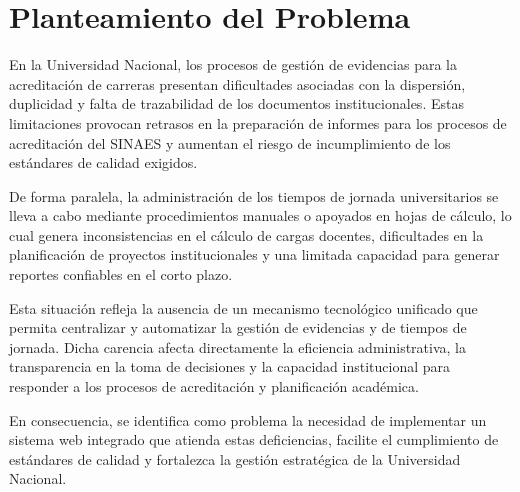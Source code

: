 \chapter{Planteamiento del Problema}

En la Universidad Nacional, los procesos de gestión de evidencias para la acreditación de carreras presentan dificultades asociadas con la dispersión, duplicidad y falta de trazabilidad de los documentos institucionales. Estas limitaciones provocan retrasos en la preparación de informes para los procesos de acreditación del SINAES y aumentan el riesgo de incumplimiento de los estándares de calidad exigidos.

De forma paralela, la administración de los tiempos de jornada universitarios se lleva a cabo mediante procedimientos manuales o apoyados en hojas de cálculo, lo cual genera inconsistencias en el cálculo de cargas docentes, dificultades en la planificación de proyectos institucionales y una limitada capacidad para generar reportes confiables en el corto plazo.

Esta situación refleja la ausencia de un mecanismo tecnológico unificado que permita centralizar y automatizar la gestión de evidencias y de tiempos de jornada. Dicha carencia afecta directamente la eficiencia administrativa, la transparencia en la toma de decisiones y la capacidad institucional para responder a los procesos de acreditación y planificación académica.

En consecuencia, se identifica como problema la necesidad de implementar un sistema web integrado que atienda estas deficiencias, facilite el cumplimiento de estándares de calidad y fortalezca la gestión estratégica de la Universidad Nacional.
